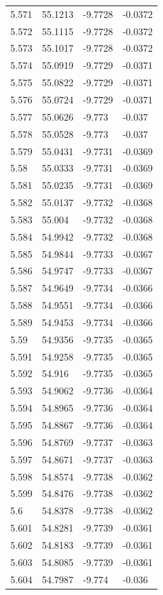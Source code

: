 \begin{tabular}{llll}
5.571 & 55.1213 & -9.7728 & -0.0372 \\
5.572 & 55.1115 & -9.7728 & -0.0372 \\
5.573 & 55.1017 & -9.7728 & -0.0372 \\
5.574 & 55.0919 & -9.7729 & -0.0371 \\
5.575 & 55.0822 & -9.7729 & -0.0371 \\
5.576 & 55.0724 & -9.7729 & -0.0371 \\
5.577 & 55.0626 & -9.773 & -0.037 \\
5.578 & 55.0528 & -9.773 & -0.037 \\
5.579 & 55.0431 & -9.7731 & -0.0369 \\
5.58 & 55.0333 & -9.7731 & -0.0369 \\
5.581 & 55.0235 & -9.7731 & -0.0369 \\
5.582 & 55.0137 & -9.7732 & -0.0368 \\
5.583 & 55.004 & -9.7732 & -0.0368 \\
5.584 & 54.9942 & -9.7732 & -0.0368 \\
5.585 & 54.9844 & -9.7733 & -0.0367 \\
5.586 & 54.9747 & -9.7733 & -0.0367 \\
5.587 & 54.9649 & -9.7734 & -0.0366 \\
5.588 & 54.9551 & -9.7734 & -0.0366 \\
5.589 & 54.9453 & -9.7734 & -0.0366 \\
5.59 & 54.9356 & -9.7735 & -0.0365 \\
5.591 & 54.9258 & -9.7735 & -0.0365 \\
5.592 & 54.916 & -9.7735 & -0.0365 \\
5.593 & 54.9062 & -9.7736 & -0.0364 \\
5.594 & 54.8965 & -9.7736 & -0.0364 \\
5.595 & 54.8867 & -9.7736 & -0.0364 \\
5.596 & 54.8769 & -9.7737 & -0.0363 \\
5.597 & 54.8671 & -9.7737 & -0.0363 \\
5.598 & 54.8574 & -9.7738 & -0.0362 \\
5.599 & 54.8476 & -9.7738 & -0.0362 \\
5.6 & 54.8378 & -9.7738 & -0.0362 \\
5.601 & 54.8281 & -9.7739 & -0.0361 \\
5.602 & 54.8183 & -9.7739 & -0.0361 \\
5.603 & 54.8085 & -9.7739 & -0.0361 \\
5.604 & 54.7987 & -9.774 & -0.036 \\

\end{tabular}
